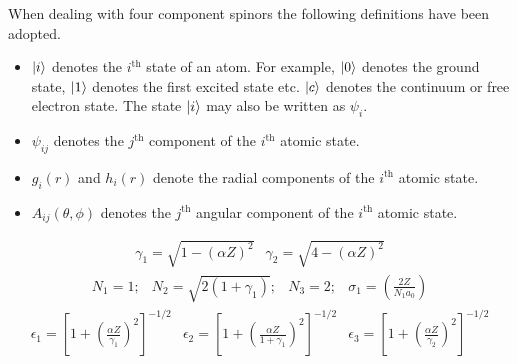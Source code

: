 When dealing with four component spinors the following definitions have been
adopted.
\begin{itemize}
    \item $|i \rangle$ denotes the $i^{\mathrm{th}}$ state of an atom. For example,
          $|0 \rangle$ denotes the ground state, $|1 \rangle$ denotes the first
          excited state etc. $|c \rangle$ denotes the continuum or free electron
          state. The state $|i \rangle$ may also be written as $\psi_i$.
    \item $\psi_{ij}$ denotes the $j^{\mathrm{th}}$ component of the 
          $i^{\mathrm{th}}$ atomic state.
    \item $g_i(r)$ and $h_i(r)$ denote the radial components of the $i^{\mathrm{th}}$
          atomic state.
    \item $A_{ij}(\theta,\phi)$ denotes the $j^{\mathrm{th}}$ angular component of the 
          $i^{\mathrm{th}}$ atomic state.

\end{itemize}
\begin{equation}
    \begin{array}{cc}
        \gamma_1 = \sqrt{1 - (\alpha Z)^2} &  \gamma_2 = \sqrt{4 - (\alpha Z)^2}
    \end{array}
\end{equation}
\begin{equation}
    \begin{array}{cccc}
        N_1 = 1 ;& N_2 = \sqrt{2(1 + \gamma_1)} ;& N_3 = 2
        ;&
        \sigma_1 = \left( \frac{2Z}{N_1 a_0} \right)
    \end{array}
\end{equation}
\begin{equation}
    \begin{array}{ccc}
        \epsilon_1 = 
            \left[ 
                1 + \left( \frac{\alpha Z}{\gamma_1} \right)^2
            \right]^{-1/2}
        &
        \epsilon_2 =
            \left[ 
                1 + \left( \frac{\alpha Z}{1+\gamma_1} \right)^2
            \right]^{-1/2}
        &
        \epsilon_3 = 
            \left[ 
                1 + \left( \frac{\alpha Z}{\gamma_2} \right)^2
            \right]^{-1/2}
    \end{array}
\end{equation}


